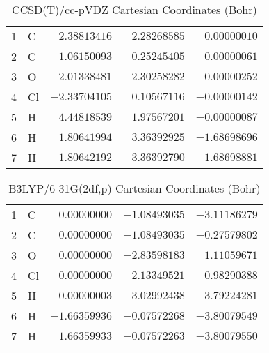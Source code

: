 \documentclass[10pt,oneside]{article}
\begin{document}
\begin{table}[h!]
\centering
\caption{CCSD(T)/cc-pVDZ Cartesian Coordinates (Bohr)}
\begin{tabular}{llrrr}
1  & C  & $ 2.38813416$ & $ 2.28268585$ & $ 0.00000010$ \\
2  & C  & $ 1.06150093$ & $-0.25245405$ & $ 0.00000061$ \\
3  & O  & $ 2.01338481$ & $-2.30258282$ & $ 0.00000252$ \\
4  & Cl & $-2.33704105$ & $ 0.10567116$ & $-0.00000142$ \\
5  & H  & $ 4.44818539$ & $ 1.97567201$ & $-0.00000087$ \\
6  & H  & $ 1.80641994$ & $ 3.36392925$ & $-1.68698696$ \\
7  & H  & $ 1.80642192$ & $ 3.36392790$ & $ 1.68698881$ \\
\end{tabular}
\end{table}

\begin{table}[h!]
\centering
\caption{B3LYP/6-31G(2df,p) Cartesian Coordinates (Bohr)}
\begin{tabular}{llrrr}
1  & C  & $ 0.00000000$ & $-1.08493035$ & $-3.11186279$ \\
2  & C  & $ 0.00000000$ & $-1.08493035$ & $-0.27579802$ \\
3  & O  & $ 0.00000000$ & $-2.83598183$ & $ 1.11059671$ \\
4  & Cl & $-0.00000000$ & $ 2.13349521$ & $ 0.98290388$ \\
5  & H  & $ 0.00000003$ & $-3.02992438$ & $-3.79224281$ \\
6  & H  & $-1.66359936$ & $-0.07572268$ & $-3.80079549$ \\
7  & H  & $ 1.66359933$ & $-0.07572263$ & $-3.80079550$ \\
\end{tabular}
\end{table}

\clearpage
\end{document}
